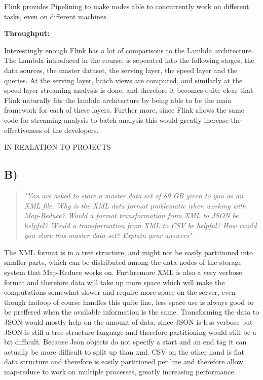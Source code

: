 Flink provides Pipelining to make nodes able to concurrently work on different tasks, even on different machines.

\newpar \textbf{Throughput:} 

\newpar Interestingly enough Flink has a lot of comparisons to the Lambda architecture. The Lambda introduced in the course, is seperated into the following stages, the data sources, the master dataset, the serving layer, the speed layer and the queries. At the serving layer, batch views are computed, and similarly at the speed layer streaming analysis is done, and therefore it becomes quite clear that Flink naturally fits the lambda architecture by being able to be the main framework for each of these layers. Further more, since Flink allows the same code for streaming analysis to batch analysis this would greatly increase the effectiveness of the developers.

\newpar IN REALATION TO PROJECTS
\subsection{B)}
\begin{quote}
		\textit{"You	are	asked	to	store	a	master	data	set	of	80	GB	given	to	you	as	an	XML	file.	Why	is	the	XML	data	format	problematic	when	working	with	Map-Reduce?	Would	a	format	transformation	from	XML	to	JSON	be	helpful?	Would	a	transformation	from	XML	to	CSV	be	helpful?	How	would	you	store	this	master	data	set?	Explain	your	answers"}
\end{quote}
The XML format is in a tree structure, and might not be easily partitioned into smaller parts, which can be distributed among the data nodes of the storage system that Map-Reduce works on. Furthremore XML is also a very verbose format and therefore data will take up more space which will make the computations somewhat slower and require more space on the server, even though hadoop of course handles this quite fine, less space use is always good to be preffered when the available information is the same. Transforming the data to JSON would mostly help on the amount of data, since JSON is less verbose but JSON is still a tree-structure language and therefore partitioning would still be a bit difficult. Because Json objects do not specify a start and an end tag it can actually be more difficult to split up than xml. CSV on the other hand is flat data structure and therefore is easily partitioned per line and therefore allow map-reduce to work on multiple processes, greatly increasing performance. 

